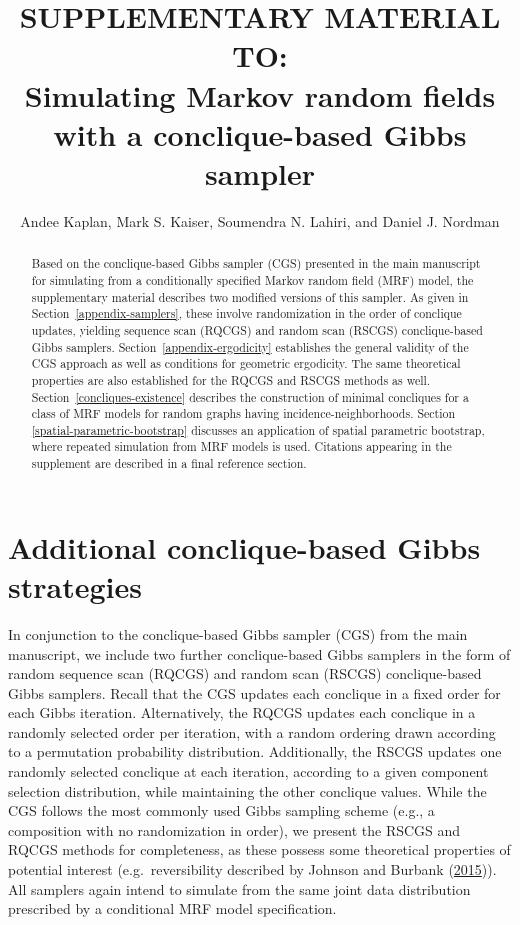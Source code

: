 \documentclass[12pt]{article}
\theoremstyle{definition}
\begin{document}
\def\spacingset#1{\renewcommand{\baselinestretch}%
{#1}\small\normalsize} \spacingset{1}

\title{\bf SUPPLEMENTARY MATERIAL TO:\\
Simulating Markov random fields with a conclique-based Gibbs sampler}
\author{Andee Kaplan, Mark S. Kaiser, Soumendra N. Lahiri, and Daniel J. Nordman}
\date{}
\maketitle
\begin{abstract}
Based on the conclique-based Gibbs sampler (CGS) presented in the main manuscript for simulating  from a conditionally specified Markov random field (MRF) model, the supplementary material describes two modified versions of this sampler. As given in Section~\ref{appendix-samplers}, these involve randomization in the order of conclique updates,   yielding sequence scan (RQCGS) and random scan (RSCGS) conclique-based Gibbs samplers. Section~\ref{appendix-ergodicity} establishes the general validity of the CGS approach as well as conditions for  geometric ergodicity.  The same  theoretical properties are also established for the RQCGS and  RSCGS methods as well.  Section~\ref{concliques-existence} describes the construction of minimal concliques for a class of MRF models for random graphs having incidence-neighborhoods. Section \ref{spatial-parametric-bootstrap} discusses an application of spatial parametric bootstrap, where repeated simulation from MRF models is used. Citations appearing in the supplement are described in a final  reference section.
\end{abstract}
\noindent%
\spacingset{1.45}

\appendix
\renewcommand\theequation{A.\arabic{equation}}

\section{Additional conclique-based Gibbs
strategies}\label{appendix-samplers}

 In conjunction to the conclique-based  Gibbs sampler (CGS) from the main manuscript,
we include two  further conclique-based Gibbs samplers in the form of random
sequence scan (RQCGS) and random scan (RSCGS) conclique-based Gibbs samplers.
Recall that the CGS
updates   each conclique in a fixed order for each Gibbs iteration. Alternatively, the
RQCGS updates each conclique in a randomly selected order per iteration, with a random ordering  drawn according to a
permutation probability distribution.  Additionally, the RSCGS   updates one randomly selected
conclique at each iteration, according to a given  component selection distribution, while maintaining the other conclique values.  While the CGS follows the
most commonly used Gibbs sampling scheme (e.g., a composition with no randomization in order), we present the RSCGS and RQCGS methods for
completeness, as these possess some theoretical properties of potential
interest (e.g.~reversibility described by Johnson and Burbank
(\protect\hyperlink{ref-johnson2015geometric}{2015})).  All samplers again intend to simulate from the same joint data distribution prescribed by a
conditional   MRF model specification.
\end{document}
